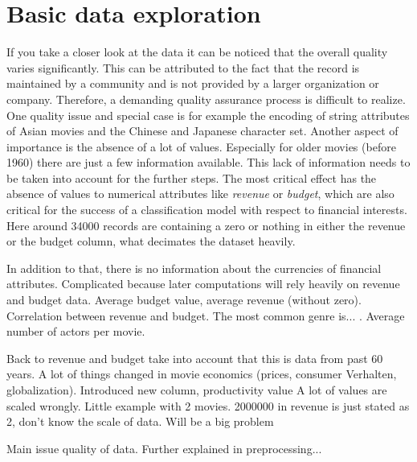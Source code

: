 \section{Basic data exploration}
If you take a closer look at the data it can be noticed that the overall quality varies significantly. This can be attributed to the fact that the record is maintained by a community and is not provided by a larger organization or company. Therefore, a demanding quality assurance process is difficult to realize. One  quality issue and special case is for example the encoding of string attributes of Asian movies and the Chinese and Japanese character set. Another aspect of importance is the absence of a lot of values. Especially for older movies (before 1960) there are just a few information available. This lack of information needs to be taken into account for the further steps. The most critical effect has the absence of values to numerical attributes like \textit{revenue} or \textit{budget}, which are also critical for the success of a classification model with respect to financial interests. Here around 34000 records are containing a zero or nothing in either the revenue or the budget column, what decimates the dataset heavily. 

In addition to that, there is no information about the currencies of financial attributes. Complicated because later computations will rely heavily on revenue and budget data. Average budget value, average revenue (without zero). Correlation between revenue and budget. The most common genre is... . Average number of actors per movie.

Back to revenue and budget take into account that this is data from past 60 years. A lot of things changed in movie economics (prices, consumer Verhalten, globalization). Introduced new column, productivity value
A lot of values are scaled wrongly. Little example with 2 movies. 2000000 in revenue is just stated as 2, don't know the scale of data. Will be a big problem


Main issue quality of data. Further explained in preprocessing...
